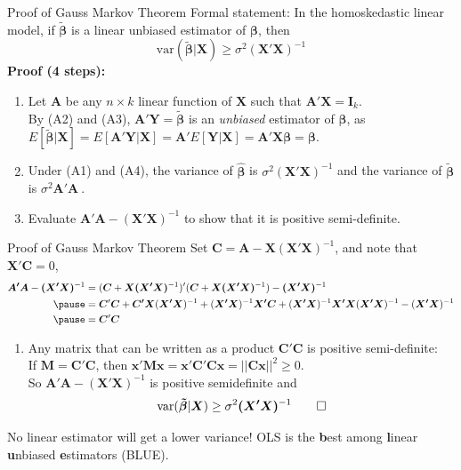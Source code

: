 \documentclass[aspectratio=169, handout]{beamer}
\numberwithin{equation}{section}
\begin{document}
\begin{frame}{Proof of Gauss Markov Theorem}
Formal statement: In the homoskedastic linear model, if $\bm{\tilde{\beta}}$ is a linear unbiased estimator of $\bm{\beta}$, then
$$\text{var}(\bm{\tilde{\beta}}|\bm{X})\geq \sigma^2\bm{(X'X)}^{-1}$$\pause
\textbf{Proof (4 steps):}\\
\begin{enumerate}
\item Let $\bm{A}$ be any $n\times k$ linear function of $\bm{X}$ such that $\bm{A}'\bm{X}=\bm{I}_k$.\\ \pause
By (A2) and (A3), $\bm{A'Y}=\bm{\tilde{\beta}}$ is an \emph{unbiased} estimator of $\bm{\beta}$, as $E[\bm{\tilde{\beta}}|\bm{X}]=E[\bm{A'Y}|\bm{X}]=\bm{A}'E[\bm{Y}|\bm{X}]=\bm{A}'\bm{X\beta}=\bm{\beta}$.

\item Under (A1) and (A4), the variance of $\bm{\hat{\beta}}$ is $\sigma^2\bm{(X'X)}^{-1}$ and the variance of $\bm{\tilde{\beta}}$ is $\sigma^2 \bm{A'A}\ $. \\ 
\item Evaluate $\bm{A'A}- \bm{(X'X)}^{-1}$ to show that it is positive semi-definite.  
\end{enumerate}
\end{frame}

\begin{frame}{Proof of Gauss Markov Theorem}
Set $\bm{C}=\bm{A}-\bm{X(X'X)}^{-1}$, and note that $\bm{X}'\bm{C}=0$, \pause
\begin{align*}
\bm{A'A}-\bm{(X'X)}^{-1}&=(\bm{C}+\bm{X(X'X)}^{-1})'(\bm{C}+\bm{X(X'X)}^{-1}) -\bm{(X'X)}^{-1}\\\pause
&=\bm{C}'\bm{C}+\bm{C'X}(\bm{X'X})^{-1}+(\bm{X'X})^{-1}\bm{X'C} +(\bm{X'X})^{-1}\bm{X'X}(\bm{X'X})^{-1}-(\bm{X'X})^{-1} \\\pause
&=\bm{C}'\bm{C}
\end{align*}
\begin{enumerate}[4]\pause
\item Any matrix that can be written as a product $\bm{C}'\bm{C}$ is positive semi-definite:\\\pause
If $\bm{M}=\bm{C}'\bm{C}$, then $\bm{x}'\bm{M}\bm{x}=\bm{x'C}'\bm{Cx}=||\bm{Cx}||^2\geq0$.\\\pause
So $\bm{A'A}- \bm{(X'X)}^{-1}$ is positive semidefinite and \pause
$$\text{var}(\bm{\tilde{\beta}}|\bm{X})\geq \sigma^2\bm{(X'X)}^{-1} \qed$$
\end{enumerate}
No linear estimator will get a lower variance! OLS is the \textbf{b}est among \textbf{l}inear \textbf{u}nbiased \textbf{e}stimators (BLUE).
\end{frame}
\end{document}
